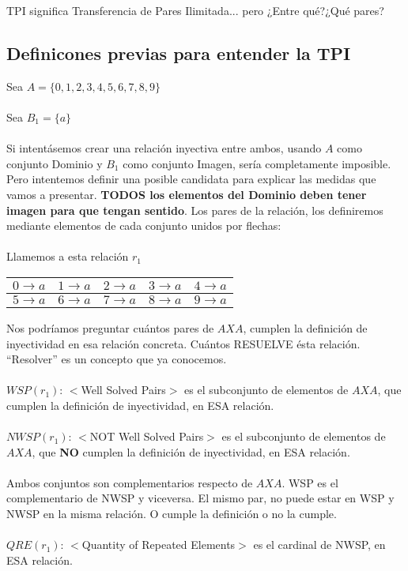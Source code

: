 	\noindent
	TPI significa Transferencia de Pares Ilimitada... pero ¿Entre qué?¿Qué pares?
	
	\subsection{Definicones previas para entender la TPI}
	\noindent
	Sea $A=\{0,1,2,3,4,5,6,7,8,9\}$\\\\
	Sea $B_{1} = \{a\}$\\\\
	Si intentásemos crear una relación inyectiva entre ambos, usando $A$ como conjunto Dominio y $B_{1}$ como conjunto Imagen, sería completamente imposible. Pero intentemos definir una posible candidata para explicar las medidas que vamos a presentar. \textbf{TODOS los elementos del Dominio deben tener imagen para que tengan sentido}. Los pares de la relación, los definiremos mediante elementos de cada conjunto unidos por flechas:\\\\
	Llamemos a esta relación $r_{1}$
	\begin{table}[h!]
		\begin{tabular}{|c|c|c|c|c|}
			\hline
			$0 \longrightarrow a$ & $1 \longrightarrow a$ & $2 \longrightarrow a$ & $3 \longrightarrow a$ & $4 \longrightarrow a$ \\ 
			\hline
			$5 \longrightarrow a$ & $6 \longrightarrow a$ & $7 \longrightarrow a$ & $8 \longrightarrow a$ & $9 \longrightarrow a$ \\  
			\hline
		\end{tabular}
	\end{table}
	
	\noindent
	Nos podríamos preguntar cuántos pares de $A X A$, cumplen la definición de inyectividad en esa relación concreta. Cuántos RESUELVE ésta relación. ``Resolver'' es un concepto que ya conocemos.\\\\
	$WSP(r_{1})$: $<$Well Solved Pairs$>$ es el subconjunto de elementos de $A X A$, que cumplen la definición de inyectividad, en ESA relación.\\\\
	$NWSP(r_{1})$: $<$NOT Well Solved Pairs$>$ es el subconjunto de elementos de $A X A$, que \textbf{NO} cumplen la definición de inyectividad, en ESA relación.\\\\
	Ambos conjuntos son complementarios respecto de $A X A$. WSP es el complementario de NWSP y viceversa. El mismo par, no puede estar en WSP y NWSP en la misma relación. O cumple la definición o no la cumple.\\\\
	$QRE(r_{1})$: $<$Quantity of Repeated Elements$>$ es el cardinal de NWSP, en ESA relación.
	\\
	
